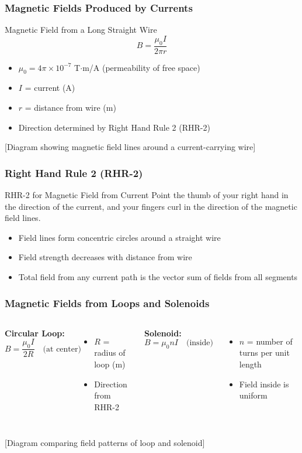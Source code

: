 \documentclass{beamer}
\begin{document}
\begin{frame}
\frametitle{Magnetic Fields Produced by Currents}
\begin{block}{Magnetic Field from a Long Straight Wire}
\begin{equation}
B = \frac{\mu_0 I}{2\pi r}
\end{equation}
\end{block}

\begin{itemize}
    \item $\mu_0 = 4\pi \times 10^{-7}$ T$\cdot$m/A (permeability of free space)
    \item $I$ = current (A)
    \item $r$ = distance from wire (m)
    \item Direction determined by Right Hand Rule 2 (RHR-2)
\end{itemize}
\alert{[Diagram showing magnetic field lines around a current-carrying wire]}
\end{frame}

\begin{frame}
\frametitle{Right Hand Rule 2 (RHR-2)}
\begin{block}{RHR-2 for Magnetic Field from Current}
Point the thumb of your right hand in the direction of the current, and your fingers curl in the direction of the magnetic field lines.
\end{block}
\begin{itemize}
    \item Field lines form concentric circles around a straight wire
    \item Field strength decreases with distance from wire
    \item Total field from any current path is the vector sum of fields from all segments
\end{itemize}
\end{frame}

\begin{frame}
\frametitle{Magnetic Fields from Loops and Solenoids}
\begin{columns}
\textbf{Circular Loop:}
\begin{equation}
B = \frac{\mu_0 I}{2R} \quad \text{(at center)}
\end{equation}
\begin{itemize}
    \item $R$ = radius of loop (m)
    \item Direction from RHR-2
\end{itemize}
\textbf{Solenoid:}
\begin{equation}
B = \mu_0 n I \quad \text{(inside)}
\end{equation}
\begin{itemize}
    \item $n$ = number of turns per unit length
    \item Field inside is uniform
\end{itemize}
\end{columns}
\alert{[Diagram comparing field patterns of loop and solenoid]}
\end{frame}
\end{document}
